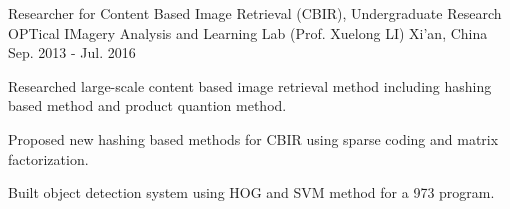 \begin{cventries}
  \cventry
    {Researcher for Content Based Image Retrieval (CBIR), Undergraduate Research} %
    {OPTical IMagery Analysis and Learning Lab (Prof. Xuelong LI)} %
    {Xi'an, China} %
    {Sep. 2013 - Jul. 2016} %
    {
      \begin{cvitems} %
        \item {Researched large-scale content based image retrieval method including hashing based method and product quantion method.}
        \item {Proposed new hashing based methods for CBIR using sparse coding and matrix factorization.}
        \item {Built object detection system using HOG and SVM method for a 973 program.}
      \end{cvitems}
    }

\end{cventries}
